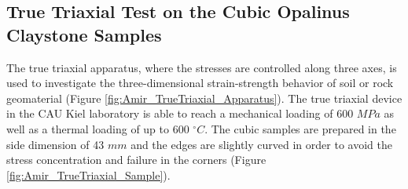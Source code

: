\subsection{True Triaxial Test on the Cubic Opalinus Claystone Samples}
\label{sec:True_Triaxial_Exp}
The true triaxial apparatus, where the stresses are controlled along three axes, is used to investigate the three-dimensional strain-strength behavior of soil or rock geomaterial (Figure \ref{fig:Amir_TrueTriaxial_Apparatus}). The true triaxial device in the CAU Kiel laboratory is able to reach a mechanical loading of 600 $MPa$ as well as a thermal loading of up to 600 $^{\circ}C$. The cubic samples are prepared in the side dimension of 43 $mm$ and the edges are slightly curved in order to avoid the stress concentration and failure in the corners (Figure \ref{fig:Amir_TrueTriaxial_Sample}).

